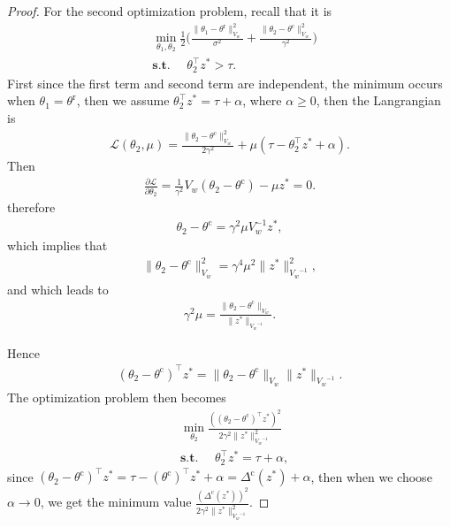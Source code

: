 \documentclass[accepted]{uai2025} %
\theoremstyle{plain}
\theoremstyle{definition}
\theoremstyle{remark}
\newcommand{\thetac}{\theta^{\mathrm{c}}}
\newcommand{\Deltac}{\Delta^{\mathrm{c}}}
\newcommand{\thetar}{\theta^{\mathrm{r}}}
\begin{document}
\begin{proof}
For the second optimization problem, recall that it is
\begin{align*}
        &\min_{\theta_1, \theta_2} \frac{1}{2} \bigg(  \frac{\lVert\theta_1-\thetar\rVert^2_{V_w^{}}}{\sigma^2}+\frac{\lVert\theta_2-\thetac\rVert^2_{V_w^{}}}{\gamma^2}\bigg)
        \\&\textbf{s.t. }\quad \theta_2^\top z^*>\tau . 
    \end{align*}
First since the first term and second term are independent, the minimum occurs when $\theta_1=\thetar$, then we assume $\theta_2^\top z^*=\tau+\alpha$, where $\alpha\ge0$, then the Langrangian is 
\begin{align*}
    \mathcal{L}(\theta_2, \mu)=\frac{\lVert\theta_2-\thetac\rVert^2_{V_w^{}}}{2\gamma^2}+\mu (\tau-\theta_2^\top z^*+\alpha).
\end{align*}
Then 
\begin{align*}
    \frac{\partial \mathcal{L}}{\partial \theta_2}=\frac{1}{\gamma^2} V_w (\theta_2 - \thetac) -\mu z^*=0.
\end{align*}
therefore
\begin{align*}
    \theta_2-\thetac=\gamma^2 \mu V_w^{-1}z^*,
\end{align*}
which implies that 
\begin{align*}
    \lVert \theta_2-\thetac \rVert^2_{V_w}=\gamma^4 \mu^2 \lVert z^*\rVert^2_{{V_w}^{-1}},
\end{align*}
and which leads to
\begin{align*}
    \gamma^2\mu=\frac{\lVert \theta_2-\thetac \rVert_{V_w}}{\lVert z^*\rVert_{{V_w}^{-1}}}.
\end{align*}

Hence
\begin{align*}
    (\theta_2-\thetac)^\top z^*={\lVert \theta_2-\thetac \rVert_{V_w}}{\lVert z^*\rVert_{{V_w}^{-1}}}.
\end{align*}
The optimization problem then becomes 
\begin{align*}
        &\min_{\theta_2} \frac{((\theta_2-\thetac)^\top z^*)^2}{2\gamma^2\lVert z^*\rVert^2_{{V_w}^{-1}}}
        \\&\textbf{s.t. }\quad \theta_2^\top z^*=\tau+\alpha  ,
    \end{align*}
since $(\theta_2-\thetac)^\top z^*=\tau-(\thetac)^\top z^*+\alpha=\Deltac(z^*)+\alpha$, then when we choose $\alpha\rightarrow 0$, we get the minimum value $\frac{(\Deltac(z^*))^2}{2\gamma^2\lVert z^*\rVert^2_{{V_w}^{-1}}}$.




\end{proof}
\end{document}
